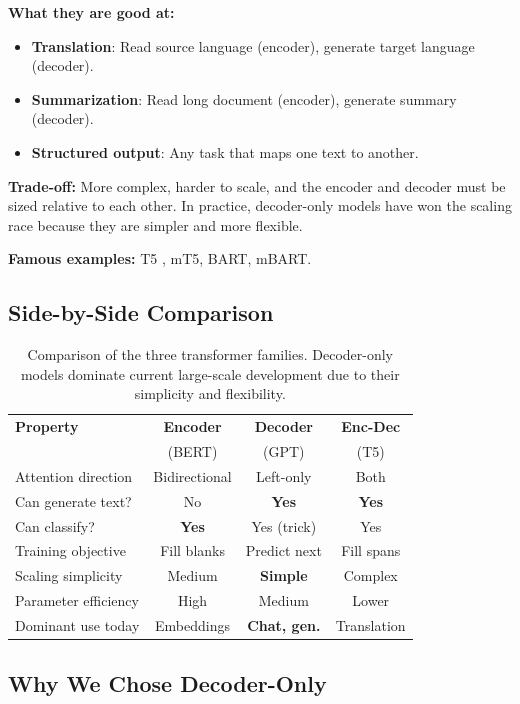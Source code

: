 \documentclass[11pt,a4paper]{article}
\begin{document}
\textbf{What they are good at:}
\begin{itemize}
    \item \textbf{Translation}: Read source language (encoder), generate target language (decoder).
    \item \textbf{Summarization}: Read long document (encoder), generate summary (decoder).
    \item \textbf{Structured output}: Any task that maps one text to another.
\end{itemize}

\textbf{Trade-off:} More complex, harder to scale, and the encoder and decoder must be sized relative to each other. In practice, decoder-only models have won the scaling race because they are simpler and more flexible.

\textbf{Famous examples:} T5 \citep{raffel2020t5}, mT5, BART, mBART.

\subsection{Side-by-Side Comparison}

\begin{table}[H]
\centering\small
\begin{tabular}{lccc}
\toprule
\textbf{Property} & \textbf{Encoder} & \textbf{Decoder} & \textbf{Enc-Dec} \\
 & (BERT) & (GPT) & (T5) \\
\midrule
Attention direction & Bidirectional & Left-only & Both \\
Can generate text? & No & \textbf{Yes} & \textbf{Yes} \\
Can classify? & \textbf{Yes} & Yes (trick) & Yes \\
Training objective & Fill blanks & Predict next & Fill spans \\
Scaling simplicity & Medium & \textbf{Simple} & Complex \\
Parameter efficiency & High & Medium & Lower \\
Dominant use today & Embeddings & \textbf{Chat, gen.} & Translation \\
\bottomrule
\end{tabular}
\caption{Comparison of the three transformer families. Decoder-only models dominate current large-scale development due to their simplicity and flexibility.}
\label{tab:arch_comparison}
\end{table}

\subsection{Why We Chose Decoder-Only}
\end{document}
